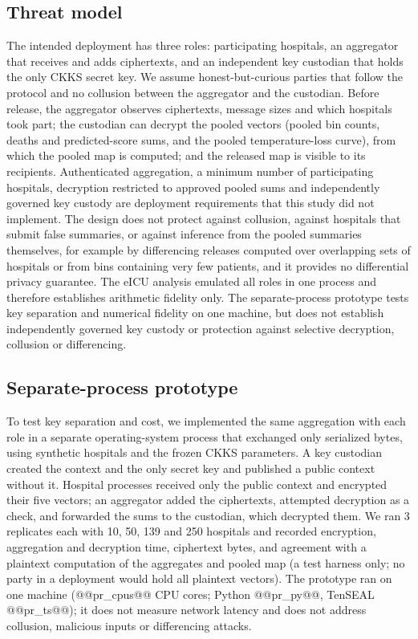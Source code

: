 \documentclass[11pt]{article}
\begin{document}
\subsection*{Threat model}\label{threat-model}
The intended deployment has three roles: participating hospitals, an aggregator that receives and adds ciphertexts, and an independent key custodian that holds the only CKKS secret key. We assume honest-but-curious parties that follow the protocol and no collusion between the aggregator and the custodian. Before release, the aggregator observes ciphertexts, message sizes and which hospitals took part; the custodian can decrypt the pooled vectors (pooled bin counts, deaths and predicted-score sums, and the pooled temperature-loss curve), from which the pooled map is computed; and the released map is visible to its recipients. Authenticated aggregation, a minimum number of participating hospitals, decryption restricted to approved pooled sums and independently governed key custody are deployment requirements that this study did not implement. The design does not protect against collusion, against hospitals that submit false summaries, or against inference from the pooled summaries themselves, for example by differencing releases computed over overlapping sets of hospitals or from bins containing very few patients, and it provides no differential privacy guarantee. The eICU analysis emulated all roles in one process and therefore establishes arithmetic fidelity only. The separate-process prototype tests key separation and numerical fidelity on one machine, but does not establish independently governed key custody or protection against selective decryption, collusion or differencing.

\subsection*{Separate-process prototype}\label{prototype-methods}

To test key separation and cost, we implemented the same aggregation with each role in a separate operating-system process that exchanged only serialized bytes, using synthetic hospitals and the frozen CKKS parameters. A key custodian created the context and the only secret key and published a public context without it. Hospital processes received only the public context and encrypted their five vectors; an aggregator added the ciphertexts, attempted decryption as a check, and forwarded the sums to the custodian, which decrypted them. We ran 3 replicates each with 10, 50, 139 and 250 hospitals and recorded encryption, aggregation and decryption time, ciphertext bytes, and agreement with a plaintext computation of the aggregates and pooled map (a test harness only; no party in a deployment would hold all plaintext vectors). The prototype ran on one machine (@@pr_cpus@@ CPU cores; Python @@pr_py@@, TenSEAL @@pr_ts@@); it does not measure network latency and does not address collusion, malicious inputs or differencing attacks.
\end{document}
